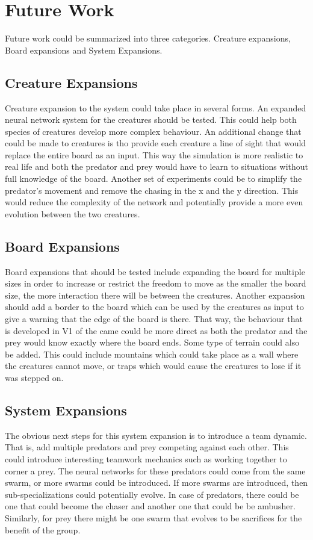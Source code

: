 \section{Future Work}
Future work could be summarized into three categories. Creature expansions, Board expansions and System Expansions.

\subsection{Creature Expansions}
Creature expansion to the system could take place in several forms. An expanded neural network system for the creatures should be tested. This could help both species of creatures develop more complex behaviour. An additional change that could be made to creatures is tho provide each creature a line of sight that would replace the entire board as an input. This way the simulation is more realistic to real life and both the predator and prey would have to learn to situations without full knowledge of the board. Another set of experiments could be to simplify the predator's movement and remove the chasing in the x and the y direction. This would reduce the complexity of the network and potentially provide a more even evolution between the two creatures.


\subsection{Board Expansions}
Board expansions that should be tested include expanding the board for multiple sizes in order to increase or restrict the freedom to move as the smaller the board size, the more interaction there will be between the creatures. Another expansion should add a border to the board which can be used by the creatures as input to give a warning that the edge of the board is there. That way, the behaviour that is developed in V1 of the came could be more direct as both the predator and the prey would know exactly where the board ends. Some type of terrain could also be added. This could include mountains which could take place as a wall where the creatures cannot move, or traps which would cause the creatures to lose if it was stepped on.


\subsection{System Expansions}
The obvious next steps for this system expansion is to introduce a team dynamic. That is, add multiple predators and prey competing against each other. This could introduce interesting teamwork mechanics such as working together to corner a prey. The neural networks for these predators could come from the same swarm, or more swarms could be introduced. If more swarms are introduced, then sub-specializations could potentially evolve. In case of predators, there could be one that could become the chaser and another one that could be be ambusher. Similarly, for prey there might be one swarm that evolves to be sacrifices for the benefit of the group.